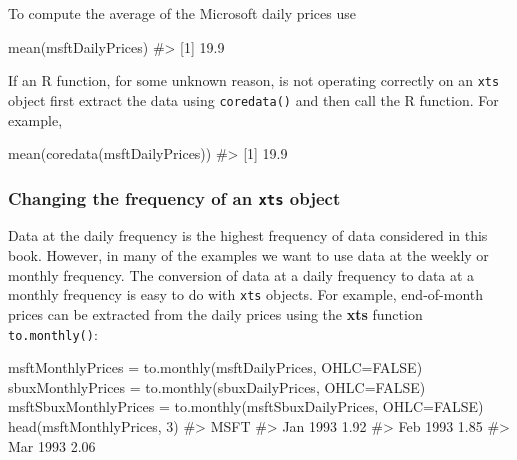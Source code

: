 \documentclass[
  letterpaper,
  DIV=11,
  numbers=noendperiod]{scrreprt}
\newenvironment{Shaded}{\begin{snugshade}}{\end{snugshade}}
\newcommand{\AttributeTok}[1]{\textcolor[rgb]{0.40,0.45,0.13}{#1}}
\newcommand{\CommentTok}[1]{\textcolor[rgb]{0.37,0.37,0.37}{#1}}
\newcommand{\ConstantTok}[1]{\textcolor[rgb]{0.56,0.35,0.01}{#1}}
\newcommand{\DecValTok}[1]{\textcolor[rgb]{0.68,0.00,0.00}{#1}}
\newcommand{\FunctionTok}[1]{\textcolor[rgb]{0.28,0.35,0.67}{#1}}
\newcommand{\NormalTok}[1]{\textcolor[rgb]{0.00,0.23,0.31}{#1}}
\newcommand{\OtherTok}[1]{\textcolor[rgb]{0.00,0.23,0.31}{#1}}
\theoremstyle{definition}
\theoremstyle{definition}
\theoremstyle{remark}
\begin{document}
To compute the average of the Microsoft daily prices use

\begin{Shaded}
\begin{Highlighting}[]
\FunctionTok{mean}\NormalTok{(msftDailyPrices)}
\CommentTok{\#\textgreater{} [1] 19.9}
\end{Highlighting}
\end{Shaded}

If an R function, for some unknown reason, is not operating correctly on
an \texttt{xts} object first extract the data using \texttt{coredata()}
and then call the R function. For example,

\begin{Shaded}
\begin{Highlighting}[]
\FunctionTok{mean}\NormalTok{(}\FunctionTok{coredata}\NormalTok{(msftDailyPrices))}
\CommentTok{\#\textgreater{} [1] 19.9}
\end{Highlighting}
\end{Shaded}

\hypertarget{changing-the-frequency-of-an-xts-object}{%
\subsubsection{\texorpdfstring{Changing the frequency of an \texttt{xts}
object}{Changing the frequency of an xts object}}\label{changing-the-frequency-of-an-xts-object}}

Data at the daily frequency is the highest frequency of data considered
in this book. However, in many of the examples we want to use data at
the weekly or monthly frequency. The conversion of data at a daily
frequency to data at a monthly frequency is easy to do with \texttt{xts}
objects. For example, end-of-month prices can be extracted from the
daily prices using the \textbf{xts} function \texttt{to.monthly()}:

\begin{Shaded}
\begin{Highlighting}[]
\NormalTok{msftMonthlyPrices }\OtherTok{=} \FunctionTok{to.monthly}\NormalTok{(msftDailyPrices, }\AttributeTok{OHLC=}\ConstantTok{FALSE}\NormalTok{) }
\NormalTok{sbuxMonthlyPrices }\OtherTok{=} \FunctionTok{to.monthly}\NormalTok{(sbuxDailyPrices, }\AttributeTok{OHLC=}\ConstantTok{FALSE}\NormalTok{)}
\NormalTok{msftSbuxMonthlyPrices }\OtherTok{=} \FunctionTok{to.monthly}\NormalTok{(msftSbuxDailyPrices, }\AttributeTok{OHLC=}\ConstantTok{FALSE}\NormalTok{) }
\FunctionTok{head}\NormalTok{(msftMonthlyPrices, }\DecValTok{3}\NormalTok{)}
\CommentTok{\#\textgreater{}          MSFT}
\CommentTok{\#\textgreater{} Jan 1993 1.92}
\CommentTok{\#\textgreater{} Feb 1993 1.85}
\CommentTok{\#\textgreater{} Mar 1993 2.06}
\end{Highlighting}
\end{Shaded}
\end{document}
